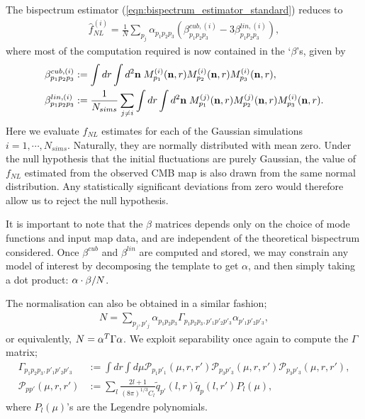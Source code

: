 The bispectrum estimator (\ref{eqn:bispectrum_estimator_standard}) reduces to
\begin{align}
	\hat{f}_{NL}^{(i)} = \frac{1}{N} \sum_{p_j} \alpha_{p_1 p_2 p_3} (\beta^{cub,(i)}_{p_1 p_2 p_3} - 3 \beta^{lin,(i)}_{p_1 p_2 p_3}), \label{eqn:fNL_from_betas}
\end{align}
where most of the computation required is now contained in the `$\beta$'s, given by
\begin{align}
	\beta^{cub,(i)}_{p_1 p_2 p_3} &:= \int dr \int d^2\mathbf{n} \; M^{(i)}_{p_1} (\mathbf{n},r) M^{(i)}_{p_2} (\mathbf{n},r) M^{(i)}_{p_3} (\mathbf{n},r),	\label{def:beta_cubic} \\
	\beta^{lin,(i)}_{p_1 p_2 p_3} &:= \frac{1}{N_{sims}} \sum_{j \neq i} \int dr \int d^2\mathbf{n} \; M^{(j)}_{p_1} (\mathbf{n},r) M^{(j)}_{p_2} (\mathbf{n},r) M^{(i)}_{p_3} (\mathbf{n},r). \label{def:beta_linear}
\end{align}
Here we evaluate $f_{NL}$ estimates for each of the Gaussian simulations $i=1,\cdots,N_{sims}$. Naturally, they are normally distributed with mean zero. Under the null hypothesis that the initial fluctuations are purely Gaussian, the value of $f_{NL}$ estimated from the observed CMB map is also drawn from the same normal distribution. Any statistically significant deviations from zero would therefore allow us to reject the null hypothesis.

It is important to note that the $\beta$ matrices depends only on the choice of mode functions and input map data, and are independent of the theoretical bispectrum considered. Once $\beta^{cub}$ and $\beta^{lin}$ are computed and stored, we may constrain any model of interest by decomposing the template to get $\alpha$, and then simply taking a dot product: $\mathbf{\alpha} \cdot \mathbf{\beta} / N$.

The normalisation can also be obtained in a similar fashion;
\begin{align}
	N = \sum_{p_j, p'_j} \alpha_{p_1 p_2 p_3} \Gamma_{p_1 p_2 p_3, p'_1 p'_2 p'_3} \alpha_{p'_1 p'_2 p'_3}, \label{eqn:normlisation_from_gamma}
\end{align}
or equivalently, $N = \mathbf{\alpha}^T \Gamma \mathbf{\alpha}$. We exploit separability once again to compute the $\Gamma$ matrix;
\begin{align}
	\Gamma_{p_1 p_2 p_3, p'_1 p'_2 p'_3} &:= \int dr \int d\mu \mathcal{P}_{p_1 p'_1}(\mu, r, r') \mathcal{P}_{p_3 p'_3}(\mu, r, r') \mathcal{P}_{p_3 p'_3}(\mu, r, r'), 	\label{def:gamma} 	\\
	\mathcal{P}_{p p'}(\mu, r, r') &:= \sum_l \frac{2l+1}{(8\pi)^{1/3} C_l} \tilde{q}_{p'}(l,r) \tilde{q}_p(l,r') P_l(\mu),
\end{align}
where $P_l(\mu)$'s are the Legendre polynomials.

